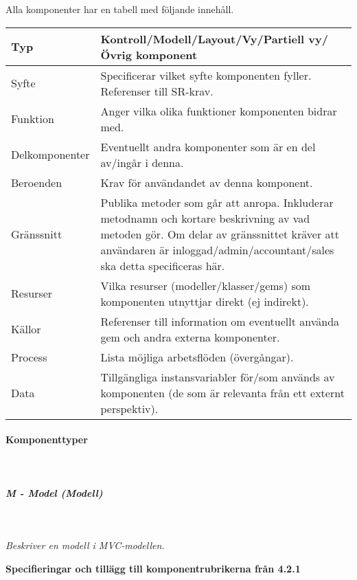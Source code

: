 \documentclass[a4paper, twoside, 11pt, titlepage]{article}
\begin{document}
			Alla komponenter har en tabell med följande innehåll.

			\begin {table} [ht] \begin{tabular} { p{2.6cm} p{12.5cm} }
				\hline
				Typ & Kontroll/Modell/Layout/Vy/Partiell vy/Övrig komponent  \\
				\hline
				Syfte & Specificerar vilket syfte komponenten fyller. Referenser till SR-krav.  \\
				\hline
				Funktion & Anger vilka olika funktioner komponenten bidrar med.  \\
				\hline
				Delkomponenter & Eventuellt andra komponenter som är en del av/ingår i denna.  \\
				\hline
				Beroenden & Krav för användandet av denna komponent.  \\
				\hline
				Gränssnitt & Publika metoder som går att anropa. Inkluderar metodnamn och kortare beskrivning av vad metoden gör. Om delar av gränssnittet kräver att användaren är inloggad/admin/accountant/sales ska detta specificeras här.  \\
				\hline
				Resurser & Vilka resurser (modeller/klasser/gems) som komponenten utnyttjar direkt (ej indirekt).  \\
				\hline
				Källor & Referenser till information om eventuellt använda gem och andra externa komponenter.  \\
				\hline
				Process & Lista möjliga arbetsflöden (övergångar).  \\
				\hline
				Data & Tillgängliga instansvariabler för/som används av komponenten (de som är relevanta från ett externt perspektiv).  \\
				\hline
			\end{tabular} \end{table} \FloatBarrier


			\paragraph{Komponenttyper}\


			\subparagraph{\emph{M - Model (\emph{Modell})}}\

				\emph{Beskriver en modell i MVC-modellen.}

				\textbf{Specifieringar och tillägg till komponentrubrikerna från 4.2.1}
\end{document}
